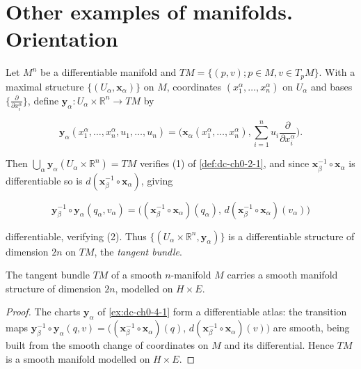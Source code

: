\section{Other examples of manifolds. Orientation}

\begin{example}
  \label{ex:dc-ch0-4-1}
  \leanok
  Let $M^n$ be a differentiable manifold and $TM=\{(p,v); p\in M, v\in T_pM\}$. With
  a maximal structure $\{(U_\alpha,\mathbf{x}_\alpha)\}$ on $M$, coordinates
  $(x_1^\alpha,\dots,x_n^\alpha)$ on $U_\alpha$ and bases
  $\{\frac{\partial}{\partial x_i^\alpha}\}$, define
  $\mathbf{y}_\alpha:U_\alpha\times\mathbb{R}^n\to TM$ by
  
  $$
  \mathbf{y}_\alpha(x_1^\alpha,\dots,x_n^\alpha,u_1,\dots,u_n)=\Big(\mathbf{x}_\alpha(x_1^\alpha,\dots,x_n^\alpha),\sum_{i=1}^n u_i\frac{\partial}{\partial x_i^\alpha}\Big).
  $$
  
  Then $\bigcup_\alpha\mathbf{y}_\alpha(U_\alpha\times\mathbb{R}^n)=TM$ verifies (1)
  of \cref{def:dc-ch0-2-1}, and since $\mathbf{x}_\beta^{-1}\circ\mathbf{x}_\alpha$ is
  differentiable so is $d(\mathbf{x}_\beta^{-1}\circ\mathbf{x}_\alpha)$, giving
  
  $$
  \mathbf{y}_\beta^{-1}\circ\mathbf{y}_\alpha(q_\alpha,v_\alpha)=\big((\mathbf{x}_\beta^{-1}\circ\mathbf{x}_\alpha)(q_\alpha),\,d(\mathbf{x}_\beta^{-1}\circ\mathbf{x}_\alpha)(v_\alpha)\big)
  $$
  
  differentiable, verifying (2). Thus $\{(U_\alpha\times\mathbb{R}^n,\mathbf{y}_\alpha)\}$
  is a differentiable structure of dimension $2n$ on $TM$, the \emph{tangent bundle}.
\end{example}

\begin{lemma}
  \label{lem:dc-ch0-4-1-manifold}
  \leanok
  The tangent bundle $TM$ of a smooth $n$-manifold $M$ carries a smooth manifold
  structure of dimension $2n$, modelled on $H\times E$.
\end{lemma}
\begin{proof}
  \leanok
  The charts $\mathbf{y}_\alpha$ of \cref{ex:dc-ch0-4-1} form a differentiable
  atlas: the transition maps
  $\mathbf{y}_\beta^{-1}\circ\mathbf{y}_\alpha(q,v)=\big((\mathbf{x}_\beta^{-1}\circ\mathbf{x}_\alpha)(q),\,d(\mathbf{x}_\beta^{-1}\circ\mathbf{x}_\alpha)(v)\big)$
  are smooth, being built from the smooth change of coordinates on $M$ and its
  differential. Hence $TM$ is a smooth manifold modelled on $H\times E$.
\end{proof}

